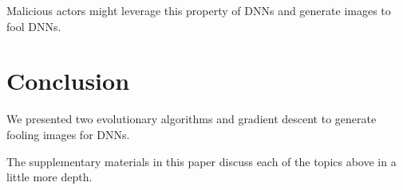 \documentclass[a4paper]{article}
\begin{document}
Malicious actors might leverage this property of DNNs and generate images to
fool DNNs.

\section{Conclusion}
We presented two evolutionary algorithms and gradient descent to generate
fooling images for DNNs.

The supplementary materials in this paper discuss each of the topics above
in a little more depth.
\end{document}
